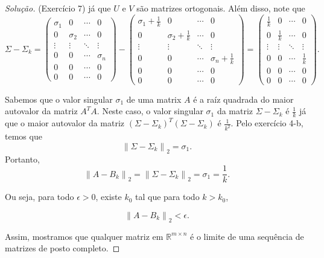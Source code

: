 \documentclass[a4paper,10pt]{article}
\newenvironment{solution}
  {\begin{proof}[Solução]}
  {\end{proof}}
\newcommand{\norm}[1]{\left\lVert#1\right\rVert}
\begin{document}
\begin{solution}{(Exercício 7)}
    já que $U$ e $V$ são matrizes ortogonais. Além disso, note que
    \begin{equation*}
      \Sigma - \Sigma_k =
      \begin{pmatrix}
        \sigma_1 & 0 & \cdots & 0 \\
        0 & \sigma_2 & \cdots & 0 \\
        \vdots & \vdots & \ddots & \vdots \\
        0 & 0 & \cdots & \sigma_n \\
        0 & 0 & \cdots & 0 \\
        0 & 0 & \cdots & 0
      \end{pmatrix}
      -
      \begin{pmatrix}
        \sigma_1 + \frac{1}{k} & 0 & \cdots & 0 \\
        0 & \sigma_2 + \frac{1}{k} & \cdots & 0 \\
        \vdots & \vdots & \ddots & \vdots \\
        0 & 0 & \cdots & \sigma_n + \frac{1}{k} \\
        0 & 0 & \cdots & 0 \\
        0 & 0 & \cdots & 0
      \end{pmatrix}
      =
      \begin{pmatrix}
        \frac{1}{k} & 0 & \cdots & 0 \\
        0 & \frac{1}{k} & \cdots & 0 \\
        \vdots & \vdots & \ddots & \vdots \\
        0 & 0 & \cdots & \frac{1}{k} \\
        0 & 0 & \cdots & 0 \\
        0 & 0 & \cdots & 0
      \end{pmatrix}.
    \end{equation*}

    Sabemos que o valor singular $\sigma_1$ de uma matrix $A$ é a raíz quadrada
    do maior autovalor da matriz $A^TA$. Neste caso, o valor singular $\sigma_1$ da
    matriz $\Sigma - \Sigma_k$ é $\frac{1}{k}$ já que o maior autovalor da
    matriz $(\Sigma - \Sigma_k)^T(\Sigma - \Sigma_k)$ é $\frac{1}{k^2}$.
    Pelo exercício 4-b, temos que
    \begin{equation*}
      \norm{\Sigma - \Sigma_k}_2 = \sigma_1.
    \end{equation*}
    Portanto,
    \begin{equation*}
      \norm{A - B_k}_2 = \norm{\Sigma - \Sigma_k}_2 = \sigma_1 = \frac{1}{k}.
    \end{equation*}

    Ou seja, para todo $\epsilon > 0$, existe $k_0$ tal que para todo $k > k_0$,

    \begin{equation*}
      \norm{A - B_k}_2 < \epsilon.
    \end{equation*}

    Assim, mostramos que qualquer matriz em $\mathbb{R}^{m\times n}$ é o limite de uma
    sequência de matrizes de posto completo.
  \end{solution}
\end{document}
